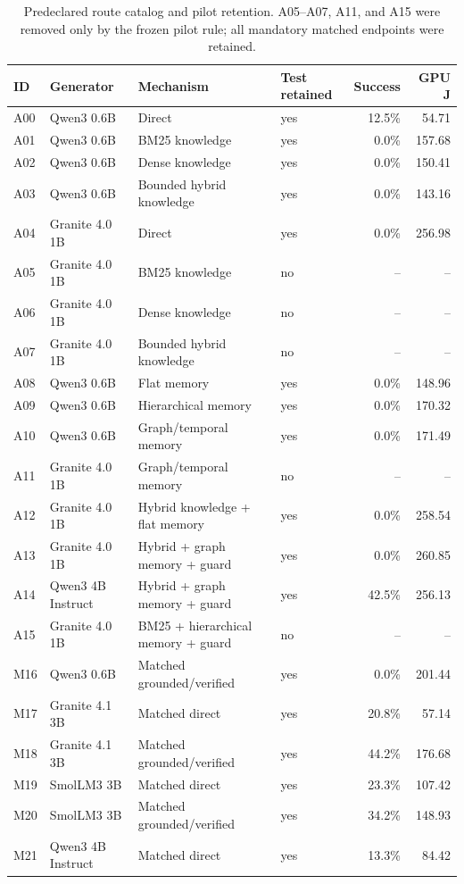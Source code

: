 \begin{table}[t]
\caption{Predeclared route catalog and pilot retention. A05--A07, A11, and A15 were removed only by the frozen pilot rule; all mandatory matched endpoints were retained.}
\label{tab:route-catalog}
\centering
\scriptsize
\begin{tabularx}{\textwidth}{@{}llXlrr@{}}
\toprule
ID & Generator & Mechanism & Test retained & Success & GPU J \\
\midrule
A00 & Qwen3 0.6B & Direct & yes & 12.5\% & 54.71 \\
A01 & Qwen3 0.6B & BM25 knowledge & yes & 0.0\% & 157.68 \\
A02 & Qwen3 0.6B & Dense knowledge & yes & 0.0\% & 150.41 \\
A03 & Qwen3 0.6B & Bounded hybrid knowledge & yes & 0.0\% & 143.16 \\
A04 & Granite 4.0 1B & Direct & yes & 0.0\% & 256.98 \\
A05 & Granite 4.0 1B & BM25 knowledge & no & -- & -- \\
A06 & Granite 4.0 1B & Dense knowledge & no & -- & -- \\
A07 & Granite 4.0 1B & Bounded hybrid knowledge & no & -- & -- \\
A08 & Qwen3 0.6B & Flat memory & yes & 0.0\% & 148.96 \\
A09 & Qwen3 0.6B & Hierarchical memory & yes & 0.0\% & 170.32 \\
A10 & Qwen3 0.6B & Graph/temporal memory & yes & 0.0\% & 171.49 \\
A11 & Granite 4.0 1B & Graph/temporal memory & no & -- & -- \\
A12 & Granite 4.0 1B & Hybrid knowledge + flat memory & yes & 0.0\% & 258.54 \\
A13 & Granite 4.0 1B & Hybrid + graph memory + guard & yes & 0.0\% & 260.85 \\
A14 & Qwen3 4B Instruct & Hybrid + graph memory + guard & yes & 42.5\% & 256.13 \\
A15 & Granite 4.0 1B & BM25 + hierarchical memory + guard & no & -- & -- \\
M16 & Qwen3 0.6B & Matched grounded/verified & yes & 0.0\% & 201.44 \\
M17 & Granite 4.1 3B & Matched direct & yes & 20.8\% & 57.14 \\
M18 & Granite 4.1 3B & Matched grounded/verified & yes & 44.2\% & 176.68 \\
M19 & SmolLM3 3B & Matched direct & yes & 23.3\% & 107.42 \\
M20 & SmolLM3 3B & Matched grounded/verified & yes & 34.2\% & 148.93 \\
M21 & Qwen3 4B Instruct & Matched direct & yes & 13.3\% & 84.42 \\
\bottomrule
\end{tabularx}
\end{table}
